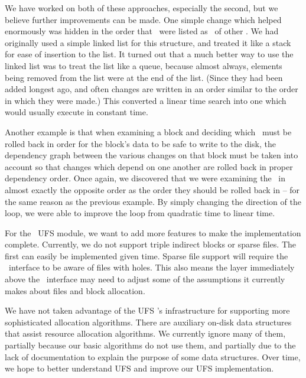 We have worked on both of these approaches, especially the second, but we
believe further improvements can be made. One simple change which helped
enormously was hidden in the order that \chdescs\ were listed as \befores\ of
other \chdescs. We had originally used a simple linked list for this structure,
and treated it like a stack for ease of insertion to the list. It turned out
that a much better way to use the linked list was to treat the list like a
queue, because almost always, elements being removed from the list were at the
end of the list. (Since they had been added longest ago, and often changes are
written in an order similar to the order in which they were made.) This
converted a linear time search into one which would usually execute in constant
time.

Another example is that when examining a block and deciding which \chdescs\ must
be rolled back in order for the block's data to be safe to write to the disk,
the dependency graph between the various changes on that block must be taken
into account so that changes which depend on one another are rolled back in
proper dependency order. Once again, we discovered that we were examining the
\chdescs\ in almost exactly the opposite order as the order they should be
rolled back in -- for the same reason as the previous example. By simply
changing the direction of the loop, we were able to improve the loop from
quadratic time to linear time.


For the \Kudos\ UFS module, we want to add more features to make the
implementation complete. Currently, we do not support triple
indirect blocks or sparse files. The first can easily be implemented
given time. Sparse file support will require the \LFS\ interface to be aware of
files with holes. This also means the layer immediately above the \LFS\ interface
may need to adjust some of the assumptions it currently makes about files and
block allocation.

We have not taken advantage of the UFS \module's infrastructure for supporting
more sophisticated allocation algorithms. There are auxiliary on-disk data
structures that assist resource allocation algorithms. We currently ignore many
of them, partially because our basic algorithms do not use them, and partially
due to the lack of documentation to explain the purpose of some data
structures. Over time, we hope to better understand UFS and improve our UFS
implementation. 

